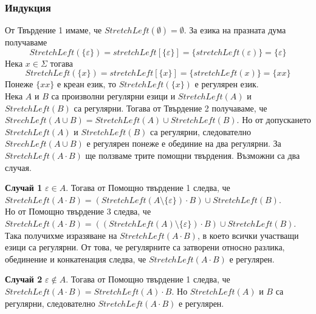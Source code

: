 \documentclass[12pt]{article}
\begin{document}
\subsubsection*{Индукция}
От Твърдение 1 имаме, че \(StretchLeft(\emptyset) = \emptyset\). За езика на празната дума получаваме
\[StretchLeft(\{\varepsilon\}) = stretchLeft[\{\varepsilon\}] = \{ stretchLeft(\varepsilon) \}  = \{ \varepsilon \}\]
Нека \(x \in \Sigma\) тогава 
\[StretchLeft(\{x\}) = stretchLeft[\{x\}] = \{ stretchLeft(x) \}  = \{ xx \}\]
Понеже \(\{ xx \}\) е креан език, то \(StretchLeft(\{x\})\) е регулярен език. \\
Нека \(A\) и \(B\) са произволни регулярни езици и \(StretchLeft(A)\) и \(StretchLeft(B)\) са регулярни.
Тогава от Твърдение 2 получаваме, че \(StrechLeft(A \cup B) = StretchLeft(A) \cup StretchLeft(B)\).
Но от допускането \(StretchLeft(A)\) и \(StretchLeft(B)\) са регулярни, следователно \(StrechLeft(A \cup B)\) е регулярен
понеже е обединие на два регулярни. За \(StretchLeft(A \cdot B)\) ще ползваме трите помощни твърдения.
Възможни са два случая. \\

\vspace*{3mm}

\par \textbf{Случай 1} \(\varepsilon \in A\). Тогава от Помощно твърдение 1 следва, че \\
\(StretchLeft(A \cdot B) = (StretchLeft(A \setminus \{\varepsilon\}) \cdot B) \cup StretchLeft(B)\). \\
Но от Помощно твърдение 3 следва, че \\
\(StretchLeft(A \cdot B) = ((StretchLeft(A) \setminus \{\varepsilon\}) \cdot B) \cup StretchLeft(B)\).
Така получихме изразяване на \(StretchLeft(A \cdot B)\), в което всички участващи езици са регулярни.
От това, че регулярните са затворени относно разлика, обединение и конкатенация следва,
че \(StretchLeft(A \cdot B)\) е регулярен. \\

\vspace*{3mm}

\par \textbf{Случай 2} \(\varepsilon \notin A\). Тогава от Помощно твърдение 1 следва, че \\
\(StretchLeft(A \cdot B) = StretchLeft(A) \cdot B\). Но \(StretchLeft(A)\) и \(B\) са регулярни,
следователно \(StretchLeft(A \cdot B)\) е регулярен. \\

\vspace*{3mm}
\end{document}
